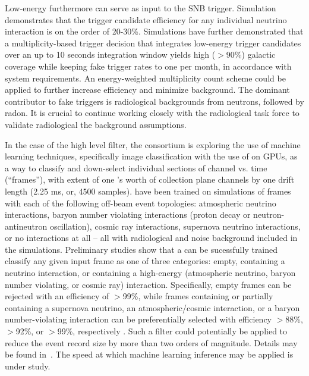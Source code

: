 Low-energy  furthermore can serve as input to the
SNB trigger. Simulation demonstrates that the trigger candidate
efficiency for any individual  neutrino interaction is on the order
of 20-30\%. Simulations have further demonstrated that a
multiplicity-based  trigger decision that integrates low-energy
trigger candidates over an up to 10 seconds
integration window yields high ($>90$\%) galactic coverage while
keeping fake  trigger rates to one per month, in accordance with system
requirements. An energy-weighted multiplicity count scheme could be
applied to further increase efficiency and minimize background.
The dominant contributor to fake  triggers is
radiological backgrounds from neutrons, followed by radon. It is
crucial to continue working closely with the radiological task force
to validate radiological the background assumptions.

In the case of the high level filter, the consortium is exploring the
use of machine learning techniques, specifically image classification
with the use of  on GPUs, as a way to
classify and down-select individual sections of  channel vs. time
(``frames''), with extent of one 's worth of collection plane
channels by one drift length (2.25 ms, or, 4500 samples).  have
been trained on  simulations of frames with each of
the following off-beam event topologies: 
atmospheric neutrino interactions, baryon number violating
interactions (proton decay or neutron-antineutron oscillation), cosmic
ray interactions, supernova neutrino interactions, or no interactions at all -- all
with radiological and noise background included in the
simulations. Preliminary studies show that a  can be sucessfully trained classify any
given input frame as one of three categories: empty, containing a  neutrino
interaction, or containing a high-energy (atmospheric neutrino, baryon
number violating, or cosmic ray) interaction. Specifically, empty frames can be
rejected with an efficiency of $>$99\%, while frames containing or
partially containing 
a supernova neutrino, an atmospheric/cosmic interaction, or a baryon
number-violating interaction can be preferentially selected with efficiency
$>$88\%, $>$92\%, or $>$99\%, respectively  \cite{bib:docdb11311}. Such a 
filter could potentially be applied to reduce the event record size by
more than two orders of magnitude. Details may be found in~.
The speed at which machine learning inference may be applied is under study.


